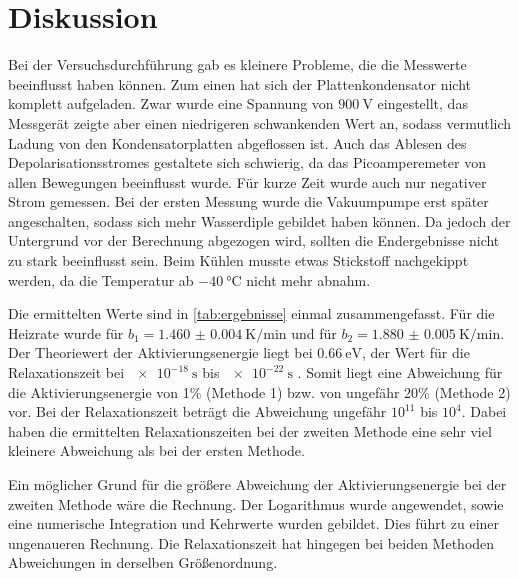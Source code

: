 \section{Diskussion}
\label{sec:Diskussion}

Bei der Versuchsdurchführung gab es kleinere Probleme, die die Messwerte beeinflusst haben können.
Zum einen hat sich der Plattenkondensator nicht komplett aufgeladen.
Zwar wurde eine Spannung von $\SI{900}{\volt}$ eingestellt, das Messgerät zeigte aber einen niedrigeren schwankenden Wert an, sodass vermutlich Ladung 
von den Kondensatorplatten abgeflossen ist.
Auch das Ablesen des Depolarisationsstromes gestaltete sich schwierig, da das Picoamperemeter von allen Bewegungen beeinflusst wurde. 
Für kurze Zeit wurde auch nur negativer Strom gemessen.
Bei der ersten Messung wurde die Vakuumpumpe erst später angeschalten, sodass sich mehr Wasserdiple gebildet haben können. Da jedoch der Untergrund 
vor der Berechnung abgezogen wird, sollten die Endergebnisse nicht zu stark beeinflusst sein. 
Beim Kühlen musste etwas Stickstoff nachgekippt werden, da die Temperatur ab $\SI{-40}{\celsius}$ nicht mehr abnahm.

\noindent
Die ermittelten Werte sind in \autoref{tab:ergebnisse} einmal zusammengefasst.
Für die Heizrate wurde für $b_1 = \SI{1.460(4)}{\kelvin\per\minute}$ und für $b_2 = \SI{1.880(5)}{\kelvin\per\minute}$.
Der Theoriewert der Aktivierungsenergie liegt bei $\SI{0.66}{\electronvolt}$, der Wert für die Relaxationszeit bei $\SI{e-18}{\second}$ bis $\SI{e-22}{\second}$ \cite{muccillo}.
Somit liegt eine Abweichung für die Aktivierungsenergie von 1\% (Methode 1) bzw. von ungefähr 20\% (Methode 2) vor.
Bei der Relaxationszeit beträgt die Abweichung ungefähr $10^{11}$ bis $10^{4}$.
Dabei haben die ermittelten Relaxationszeiten bei der zweiten Methode eine sehr viel kleinere Abweichung als bei der ersten Methode.

\noindent
Ein möglicher Grund für die größere Abweichung der Aktivierungsenergie bei der zweiten Methode wäre die Rechnung.
Der Logarithmus wurde angewendet, sowie eine numerische Integration und Kehrwerte wurden gebildet.
Dies führt zu einer ungenaueren Rechnung.
Die Relaxationszeit hat hingegen bei beiden Methoden Abweichungen in derselben Größenordnung.

